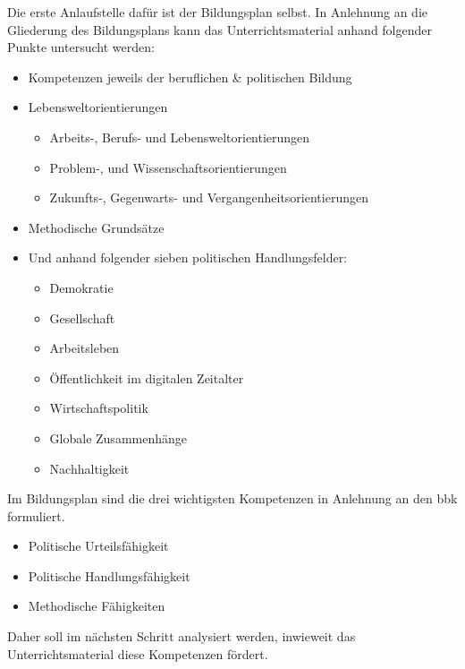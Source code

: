 Die erste Anlaufstelle dafür ist der Bildungsplan selbst. In Anlehnung an die Gliederung des Bildungsplans kann das Unterrichtsmaterial anhand folgender Punkte untersucht werden:
\begin{itemize} 
    \item Kompetenzen jeweils der beruflichen \& politischen Bildung
    \item Lebensweltorientierungen %
    \begin{itemize}
        \item Arbeits-,  Berufs- und Lebensweltorientierungen
        \item Problem-, und Wissenschaftsorientierungen
        \item Zukunfts-, Gegenwarts- und Vergangenheitsorientierungen
    \end{itemize}
    \item Methodische Grundsätze
    \item Und anhand folgender sieben politischen Handlungsfelder:
    \begin{itemize}
        \item Demokratie 
        \item Gesellschaft 
        \item Arbeitsleben
        \item Öffentlichkeit im digitalen Zeitalter
        \item Wirtschaftspolitik
        \item Globale Zusammenhänge 
        \item Nachhaltigkeit 
    \end{itemize}
\end{itemize}


Im Bildungsplan sind die drei wichtigsten Kompetenzen in Anlehnung an den \gls{bbk} formuliert. 

\begin{itemize}
    \item Politische Urteilsfähigkeit
    \item Politische Handlungsfähigkeit
    \item Methodische Fähigkeiten 
\end{itemize}

Daher soll im nächsten Schritt analysiert werden, inwieweit das Unterrichtsmaterial diese Kompetenzen fördert. 



